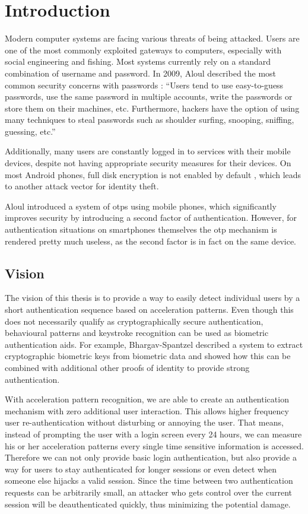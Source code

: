 \chapter{Introduction}\label{chapter:introduction}
Modern computer systems are facing various threats of being attacked. Users are one of the most commonly exploited gateways to computers, especially with social engineering and fishing. Most systems currently rely on a standard combination of username and password. In 2009, Aloul \etal described the most common security concerns with passwords \cite{aloul2009two}:
``Users tend to use easy-to-guess passwords, use the same password in multiple accounts, write the passwords or store them on their machines, etc. Furthermore, hackers have the option of using many techniques to steal passwords such as shoulder surfing, snooping, sniffing, guessing, etc.''

Additionally, many users are constantly logged in to services with their mobile devices, despite not having appropriate security measures for their devices. On most Android phones, full disk encryption is not enabled by default \cite{manhattan2015encryption}, which leads to another attack vector for identity theft.

Aloul \etal introduced a system of \glspl{otp} using mobile phones, which significantly improves security by introducing a second factor of authentication. However, for authentication situations on smartphones themselves the \gls{otp} mechanism is rendered pretty much useless, as the second factor is in fact on the same device.

\section{Vision}
The vision of this thesis is to provide a way to easily detect individual users by a short authentication sequence based on acceleration patterns. Even though this does not necessarily qualify as cryptographically secure authentication, behavioural patterns and keystroke recognition can be used as biometric authentication aids. For example, Bhargav-Spantzel \etal \cite{bhargav2006privacy} described a system to extract cryptographic biometric keys from biometric data and showed how this can be combined with additional other proofs of identity to provide strong authentication.

With acceleration pattern recognition, we are able to create an authentication mechanism with zero additional user interaction. This allows higher frequency user re-authentication without disturbing or annoying the user. That means, instead of prompting the user with a login screen every 24 hours, we can measure his or her acceleration patterns every single time sensitive information is accessed. Therefore we can not only provide basic login authentication, but also provide a way for users to stay authenticated for longer sessions or even detect when someone else hijacks a valid session. Since the time between two authentication requests can be arbitrarily small, an attacker who gets control over the current session will be deauthenticated quickly, thus minimizing the potential damage.
